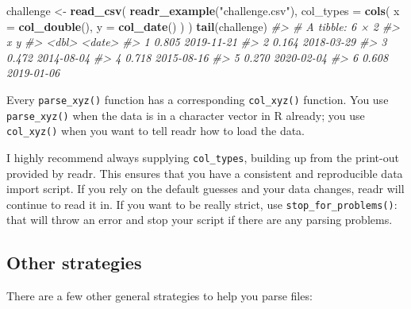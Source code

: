 \documentclass[]{book}
\newenvironment{Shaded}{\begin{snugshade}}{\end{snugshade}}
\newcommand{\KeywordTok}[1]{\textcolor[rgb]{0.13,0.29,0.53}{\textbf{{#1}}}}
\newcommand{\DataTypeTok}[1]{\textcolor[rgb]{0.13,0.29,0.53}{{#1}}}
\newcommand{\StringTok}[1]{\textcolor[rgb]{0.31,0.60,0.02}{{#1}}}
\newcommand{\CommentTok}[1]{\textcolor[rgb]{0.56,0.35,0.01}{\textit{{#1}}}}
\newcommand{\NormalTok}[1]{{#1}}
\begin{document}
\begin{Shaded}
\begin{Highlighting}[]
\NormalTok{challenge <-}\StringTok{ }\KeywordTok{read_csv}\NormalTok{(}
  \KeywordTok{readr_example}\NormalTok{(}\StringTok{"challenge.csv"}\NormalTok{), }
  \DataTypeTok{col_types =} \KeywordTok{cols}\NormalTok{(}
    \DataTypeTok{x =} \KeywordTok{col_double}\NormalTok{(),}
    \DataTypeTok{y =} \KeywordTok{col_date}\NormalTok{()}
  \NormalTok{)}
\NormalTok{)}
\KeywordTok{tail}\NormalTok{(challenge)}
\CommentTok{#> # A tibble: 6 × 2}
\CommentTok{#>       x          y}
\CommentTok{#>   <dbl>     <date>}
\CommentTok{#> 1 0.805 2019-11-21}
\CommentTok{#> 2 0.164 2018-03-29}
\CommentTok{#> 3 0.472 2014-08-04}
\CommentTok{#> 4 0.718 2015-08-16}
\CommentTok{#> 5 0.270 2020-02-04}
\CommentTok{#> 6 0.608 2019-01-06}
\end{Highlighting}
\end{Shaded}

Every \texttt{parse\_xyz()} function has a corresponding
\texttt{col\_xyz()} function. You use \texttt{parse\_xyz()} when the
data is in a character vector in R already; you use \texttt{col\_xyz()}
when you want to tell readr how to load the data.

I highly recommend always supplying \texttt{col\_types}, building up
from the print-out provided by readr. This ensures that you have a
consistent and reproducible data import script. If you rely on the
default guesses and your data changes, readr will continue to read it
in. If you want to be really strict, use \texttt{stop\_for\_problems()}:
that will throw an error and stop your script if there are any parsing
problems.

\subsection{Other strategies}\label{other-strategies}

There are a few other general strategies to help you parse files:
\end{document}
